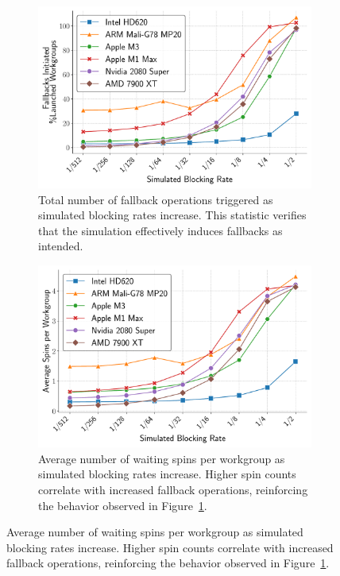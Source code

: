 \documentclass[acmsmall, manuscript, screen, review, anonymous]{acmart}
\begin{document}
\begin{figure}
  \centering
  \begin{subfigure}[t]{0.48\linewidth}
    \centering
    \includegraphics[width=\linewidth]{graphics/fallbacksInitiated_plot.pdf}
    \caption{Total number of fallback operations triggered as simulated blocking rates increase. This statistic verifies that the simulation effectively induces fallbacks as intended.\label{fig:fallbacks_initiated}}
  \end{subfigure}\hfill
  \begin{subfigure}[t]{0.48\linewidth}
    \centering
    \includegraphics[width=\linewidth]{graphics/totalSpins_plot.pdf}
    \caption{Average number of waiting spins per workgroup as simulated blocking rates increase. Higher spin counts correlate with increased fallback operations, reinforcing the behavior observed in Figure~\ref{fig:fallbacks_initiated}.\label{fig:total_spins}}
  \end{subfigure}


\end{figure}
\end{document}
